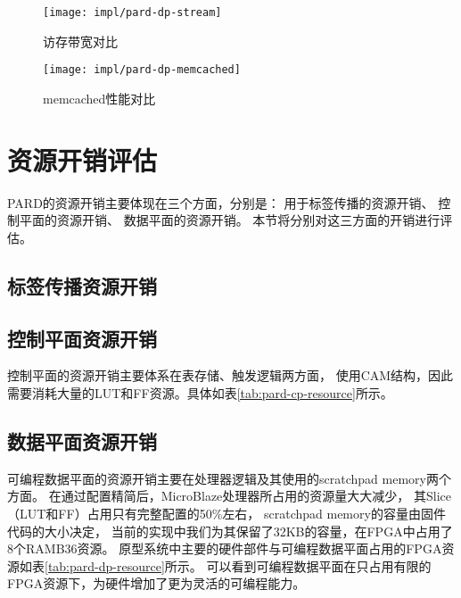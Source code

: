 \begin{figure}[tb]
\begin{minipage}{0.48\textwidth}
  \centering
  \texttt{[image: impl/pard-dp-stream]}
  \caption{访存带宽对比}
  \label{fig:pard-dp-stream}
\end{minipage}\hfill
\begin{minipage}{0.48\textwidth}
  \centering
  \texttt{[image: impl/pard-dp-memcached]}
  \caption{memcached性能对比}
  \label{fig:pard-dp-memcached}
\end{minipage}
\end{figure}


\section{资源开销评估}

PARD的资源开销主要体现在三个方面，分别是：
用于标签传播的资源开销、
控制平面的资源开销、
数据平面的资源开销。
本节将分别对这三方面的开销进行评估。

\subsection{标签传播资源开销}

\subsection{控制平面资源开销}

控制平面的资源开销主要体系在表存储、触发逻辑两方面，
使用CAM结构，因此需要消耗大量的LUT和FF资源。具体如表\ref{tab:pard-cp-resource}所示。


\subsection{数据平面资源开销}

可编程数据平面的资源开销主要在处理器逻辑及其使用的scratchpad memory两个方面。
在通过配置精简后，MicroBlaze处理器所占用的资源量大大减少，
其Slice（LUT和FF）占用只有完整配置的50\%左右，
scratchpad memory的容量由固件代码的大小决定，
当前的实现中我们为其保留了32KB的容量，在FPGA中占用了8个RAMB36资源。
原型系统中主要的硬件部件与可编程数据平面占用的FPGA资源如表\ref{tab:pard-dp-resource}所示。
可以看到可编程数据平面在只占用有限的FPGA资源下，为硬件增加了更为灵活的可编程能力。

